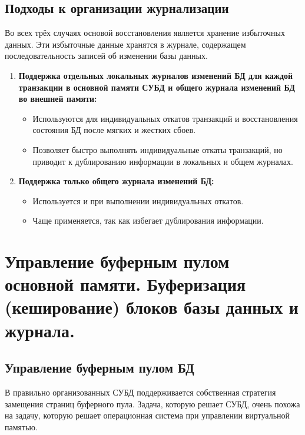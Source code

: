 \documentclass[a4paper,12pt]{article}
\begin{document}
\subsection{Подходы к организации журнализации}

Во всех трёх случаях основой восстановления является хранение избыточных данных. Эти избыточные данные хранятся в журнале, содержащем последовательность записей об изменении базы данных.

\begin{enumerate}
    \item \textbf{Поддержка отдельных локальных журналов изменений БД для каждой транзакции в основной памяти СУБД и общего журнала изменений БД во внешней памяти:}
    \begin{itemize}
        \item Используются для индивидуальных откатов транзакций и восстановления состояния БД после мягких и жестких сбоев.
        \item Позволяет быстро выполнять индивидуальные откаты транзакций, но приводит к дублированию информации в локальных и общем журналах.
    \end{itemize}
    
    \item \textbf{Поддержка только общего журнала изменений БД:}
    \begin{itemize}
        \item Используется и при выполнении индивидуальных откатов.
        \item Чаще применяется, так как избегает дублирования информации.
    \end{itemize}
\end{enumerate}

\section{Управление буферным пулом основной памяти. Буферизация (кеширование) блоков базы данных и журнала.}

\subsection{Управление буферным пулом БД}

В правильно организованных СУБД поддерживается собственная стратегия замещения страниц буферного пула. Задача, которую решает СУБД, очень похожа на задачу, которую решает операционная система при управлении виртуальной памятью.
\end{document}
